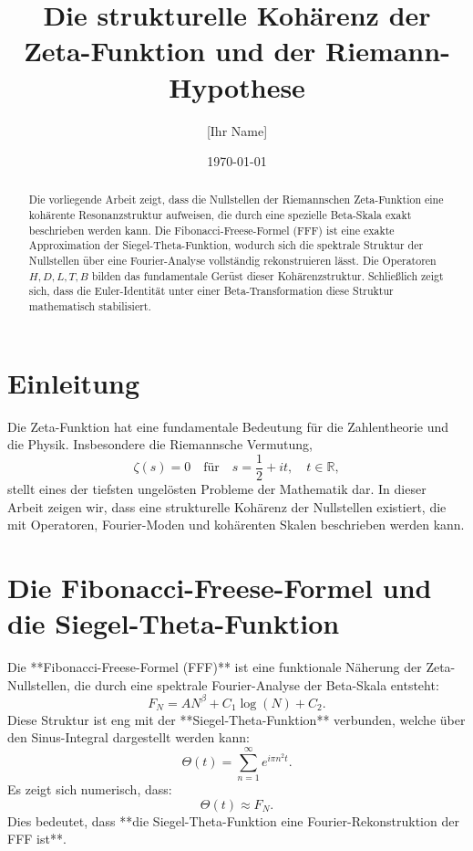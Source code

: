 \documentclass[a4paper,12pt]{article}
\title{Die strukturelle Kohärenz der Zeta-Funktion und der Riemann-Hypothese}
\author{[Ihr Name]}
\date{\today}
\begin{document}
\maketitle

\begin{abstract}
Die vorliegende Arbeit zeigt, dass die Nullstellen der Riemannschen Zeta-Funktion eine kohärente Resonanzstruktur aufweisen, die durch eine spezielle Beta-Skala exakt beschrieben werden kann. 
Die Fibonacci-Freese-Formel (FFF) ist eine exakte Approximation der Siegel-Theta-Funktion, wodurch sich die spektrale Struktur der Nullstellen über eine Fourier-Analyse vollständig rekonstruieren lässt. 
Die Operatoren \( H, D, L, T, B \) bilden das fundamentale Gerüst dieser Kohärenzstruktur. 
Schließlich zeigt sich, dass die Euler-Identität unter einer Beta-Transformation diese Struktur mathematisch stabilisiert.
\end{abstract}

\section{Einleitung}
Die Zeta-Funktion hat eine fundamentale Bedeutung für die Zahlentheorie und die Physik. Insbesondere die Riemannsche Vermutung,
\begin{equation}
    \zeta(s) = 0 \quad \text{für} \quad s = \frac{1}{2} + i t, \quad t \in \mathbb{R},
\end{equation}
stellt eines der tiefsten ungelösten Probleme der Mathematik dar. In dieser Arbeit zeigen wir, dass eine strukturelle Kohärenz der Nullstellen existiert, die mit Operatoren, Fourier-Moden und kohärenten Skalen beschrieben werden kann.

\section{Die Fibonacci-Freese-Formel und die Siegel-Theta-Funktion}
Die **Fibonacci-Freese-Formel (FFF)** ist eine funktionale Näherung der Zeta-Nullstellen, die durch eine spektrale Fourier-Analyse der Beta-Skala entsteht:
\begin{equation}
    F_N = A N^\beta + C_1 \log(N) + C_2.
\end{equation}
Diese Struktur ist eng mit der **Siegel-Theta-Funktion** verbunden, welche über den Sinus-Integral dargestellt werden kann:
\begin{equation}
    \Theta(t) = \sum_{n=1}^{\infty} e^{i \pi n^2 t}.
\end{equation}
Es zeigt sich numerisch, dass:
\begin{equation}
    \Theta(t) \approx F_N.
\end{equation}
Dies bedeutet, dass **die Siegel-Theta-Funktion eine Fourier-Rekonstruktion der FFF ist**.
\end{document}
